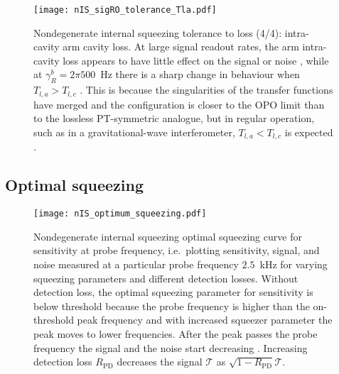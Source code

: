 \begin{figure}
	\centering
	\texttt{[image: nIS\_sigRO\_tolerance\_Tla.pdf]}
	\caption{ Nondegenerate internal squeezing tolerance to loss (4/4): intra-cavity arm cavity loss. At large signal readout rates, the arm intra-cavity loss appears to have little effect on the signal or noise , while at $\gamma^b_R=2\pi 500$~Hz there is a sharp change in behaviour when $T_{l,a}>T_{l,c}$ . This is because the singularities of the transfer functions have merged and the configuration is closer to the OPO limit than to the lossless PT-symmetric analogue, but in regular operation, such as in a gravitational-wave interferometer, $T_{l,a}<T_{l,c}$ is expected .}
	\label{fig:nIS_sigRO_tolerance_Tla}
\end{figure}






\subsection{Optimal squeezing}
\label{sec:nIS_optimal_squeezing}

\begin{figure}
	\centering
	\texttt{[image: nIS\_optimum\_squeezing.pdf]}
	\caption{  Nondegenerate internal squeezing optimal squeezing curve for sensitivity at probe frequency, i.e.\ plotting sensitivity, signal, and noise measured at a particular probe frequency $2.5$~kHz for varying squeezing parameters and different detection losses. Without detection loss, the optimal squeezing parameter for sensitivity is below threshold because the probe frequency is higher than the on-threshold peak frequency and with increased squeezer parameter the peak moves to lower frequencies. After the peak passes the probe frequency  the signal and the noise start decreasing . Increasing detection loss $R_\text{PD}$ decreases the signal $\mathcal{T}$ as $\sqrt{1-R_\text{PD}}\mathcal{T}$.}
	\label{fig:}
\end{figure}

